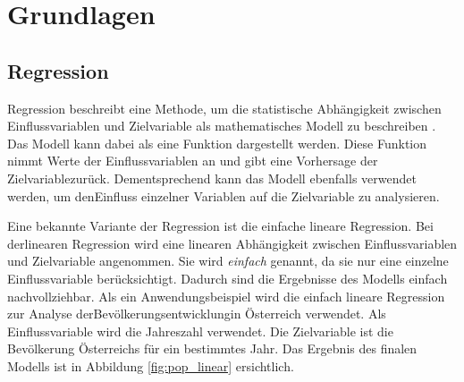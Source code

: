 \vspace{-1cm}

\chapter{Grundlagen}
\label{cha:Grundlagen}

\vspace{-1cm}

\section{Regression}
\label{sec:Regression}

Regression beschreibt eine Methode, um die statistische Abhängigkeit zwischen Einflussvariablen und Zielvariable als mathematisches Modell zu beschreiben \parencite{RegressionGrundlagen}. Das Modell kann dabei als eine Funktion dargestellt werden. Diese Funktion nimmt Werte der Einflussvariablen an und gibt eine Vorhersage der Zielvariable\linebreak zurück. Dementsprechend kann das Modell ebenfalls verwendet werden, um den\linebreak Einfluss einzelner Variablen auf die Zielvariable zu analysieren.


\noindent Eine bekannte Variante der Regression ist die einfache lineare Regression. Bei der\linebreak linearen Regression wird eine linearen Abhängigkeit zwischen Einflussvariablen und Zielvariable angenommen. Sie wird \emph{einfach} genannt, da sie nur eine einzelne Einflussvariable berücksichtigt. Dadurch sind die Ergebnisse des Modells einfach nachvollziehbar. Als ein Anwendungsbeispiel wird die einfach lineare Regression zur Analyse der\linebreak Bevölkerungsentwicklung\footnotemark  in Österreich verwendet. Als Einflussvariable wird die Jahreszahl verwendet. Die Zielvariable ist die Bevölkerung Österreichs für ein bestimmtes Jahr. Das Ergebnis des finalen Modells ist in Abbildung \ref{fig:pop_linear} ersichtlich.\\


